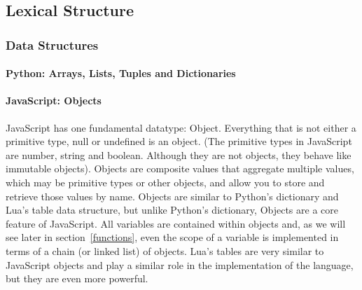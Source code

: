 \subsection{Lexical Structure}


\subsubsection{Data Structures}


\paragraph{Python: Arrays, Lists, Tuples and Dictionaries}


\paragraph{JavaScript: Objects}


JavaScript has one fundamental datatype: Object. Everything that is not either a
primitive type, null or undefined is an object. (The primitive types in JavaScript are
number, string and boolean. Although they are not objects, they behave like immutable
objects). Objects are composite values that aggregate multiple values, which may be
primitive types or other objects, and allow you to store and retrieve those values
by name. Objects are similar to Python's dictionary and Lua's table data structure, but
unlike Python's dictionary, Objects are a core feature of JavaScript. All variables are
contained within objects and, as we will see later in section~\ref{functions}, even
the scope of a variable is implemented in terms of a chain (or linked list) of objects.
Lua's tables are very similar to JavaScript objects and play a similar role in the
implementation of the language, but they are even more powerful.

